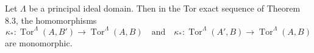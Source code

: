 Let $\Lambda$ be a principal ideal domain. Then in the Tor exact sequence of Theorem 8.3, the homomorphisms
$$
\kappa_* : \operatorname{Tor}^\Lambda(A, B') \to \operatorname{Tor}^\Lambda(A, B) \quad\text{and}\quad \kappa_* : \operatorname{Tor}^\Lambda(A', B) \to \operatorname{Tor}^\Lambda(A, B)
$$
are monomorphic.
